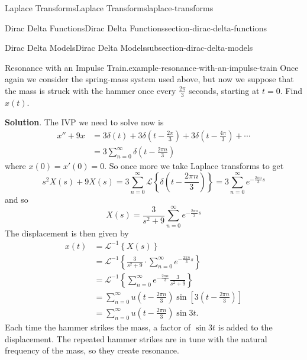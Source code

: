 \documentclass[oneside,10pt,]{book}
\numberwithin{equation}{section}
\newcommand{\Sum}[2]{\sum_{#1}^{#2}}
\newcommand{\Laplace}[1]{\mathcal{L}\left\{#1\right\}}
\newcommand{\iLaplace}[1]{\mathcal{L}^{-1}\left\{#1\right\}}
\newcommand{\amp}{&}
\begin{document}
\begin{chapterptx}{Laplace Transforms}{}{Laplace Transforms}{}{}{laplace-transforms}
\begin{sectionptx}{Dirac Delta Functions}{}{Dirac Delta Functions}{}{}{section-dirac-delta-functions}
\begin{subsectionptx}{Dirac Delta Models}{}{Dirac Delta Models}{}{}{subsection-dirac-delta-models}
\begin{figure}
{
}
\end{figure}
\begin{example}{Resonance with an Impulse Train.}{example-resonance-with-an-impulse-train}%
\hypertarget{p-551}{}%
Once again we consider the spring-mass system used above, but now we suppose that the mass is struck with the hammer once every \(\frac{2\pi}{3}\) seconds, starting at \(t=0\). Find \(x(t)\).%
\par\smallskip%
\noindent\textbf{Solution}.\hypertarget{solution-89}{}\quad%
\hypertarget{p-552}{}%
The IVP we need to solve now is%
\begin{align*}
x''+9x \amp= 3\delta(t)+3\delta(t-\frac{2\pi}{3}) + 3\delta(t-\frac{4\pi}{3}) +\cdots\\
\amp= 3\Sum{n=0}{\infty}\delta(t-\frac{2\pi n}{3})
\end{align*}
where \(x(0) = x'(0) = 0\). So once more we take Laplace transforms to get%
\begin{equation*}
s^{2}X(s)+9X(s) = 3\Sum{n=0}{\infty}\Laplace{\delta(t-\frac{2\pi n}{3})} = 3\Sum{n=0}{\infty}e^{-\frac{2\pi n}{3}s}
\end{equation*}
and so%
\begin{equation*}
X(s) = \frac{3}{s^{2}+9}\Sum{n=0}{\infty}e^{-\frac{2\pi n}{3}s}
\end{equation*}
The displacement is then given by%
\begin{align*}
x(t) \amp= \iLaplace{X(s)}\\
\amp= \iLaplace{\frac{3}{s^{2}+9}\cdot\Sum{n=0}{\infty}e^{-\frac{2\pi n}{3}s}}\\
\amp= \iLaplace{\Sum{n=0}{\infty}e^{-\frac{2\pi n}{3}}\frac{3}{s^{2}+9}}\\
\amp= \Sum{n=0}{\infty}u(t-\frac{2\pi n}{3})\sin[3(t-\frac{2\pi n}{3})]\\
\amp= \Sum{n=0}{\infty}u(t-\frac{2\pi n}{3})\sin3t\text{.}
\end{align*}
Each time the hammer strikes the mass, a factor of \(\sin3t\) is added to the displacement. The repeated hammer strikes are in tune with the natural frequency of the mass, so they create resonance.%
\end{example}

\end{subsectionptx}
\end{sectionptx}
\end{chapterptx}
\end{document}
